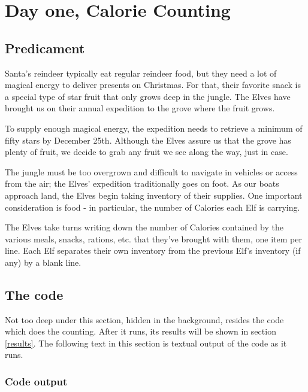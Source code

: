 \documentclass[]{article}
\begin{document}
    
  \section{Day one, Calorie Counting}

    \subsection{Predicament}

      Santa's reindeer typically eat regular reindeer food, but they need a lot of magical energy to deliver presents on Christmas. For that, their favorite snack is a special type of star fruit that only grows deep in the jungle. The Elves have brought us on their annual expedition to the grove where the fruit grows.

      To supply enough magical energy, the expedition needs to retrieve a minimum of fifty stars by December 25th. Although the Elves assure us that the grove has plenty of fruit, we decide to grab any fruit we see along the way, just in case.

      The jungle must be too overgrown and difficult to navigate in vehicles or access from the air; the Elves' expedition traditionally goes on foot. As our boats approach land, the Elves begin taking inventory of their supplies. One important consideration is food - in particular, the number of Calories each Elf is carrying.

      The Elves take turns writing down the number of Calories contained by the various meals, snacks, rations, etc. that they've brought with them, one item per line. Each Elf separates their own inventory from the previous Elf's inventory (if any) by a blank line.

    \subsection{The code}

      Not too deep under this section, hidden in the background, resides the code which does the counting. After it runs, its results will be shown in section \ref{results}. The following text in this section is textual output of the code as it runs.

      \subsubsection{Code output}

        
        \ExplSyntaxOn
\end{document}

